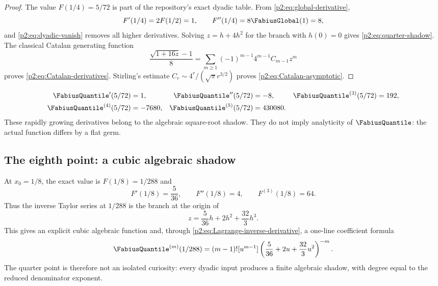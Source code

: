 \documentclass[11pt,oneside]{article}
\numberwithin{equation}{section}
\theoremstyle{definition}
\theoremstyle{remark}
\begin{document}
\begin{proof}
The value $F(1/4)=5/72$ is part of the repository's exact dyadic table.  From
\eqref{p2:eq:global-derivative},
\[
 F'(1/4)=2F(1/2)=1,
 \qquad
 F''(1/4)=8\FabiusGlobal(1)=8,
\]
and \eqref{p2:eq:dyadic-vanish} removes all higher derivatives.  Solving
$z=h+4h^2$ for the branch with $h(0)=0$ gives \eqref{p2:eq:quarter-shadow}.  The classical Catalan
generating function
\[
 \frac{\sqrt{1+16z}-1}{8}
 =\sum_{m\ge1}(-1)^{m-1}4^{m-1}C_{m-1}z^m
\]
proves \eqref{p2:eq:Catalan-derivatives}.  Stirling's estimate
$C_r\sim4^r/(\sqrt\pi r^{3/2})$ proves \eqref{p2:eq:Catalan-asymptotic}.
\end{proof}

\begin{example}
\begin{align*}
 \FabiusQuantile'(5/72)&=1,
 & \FabiusQuantile''(5/72)&=-8,
 & \FabiusQuantile^{(3)}(5/72)&=192,\\
 \FabiusQuantile^{(4)}(5/72)&=-7680,
 & \FabiusQuantile^{(5)}(5/72)&=430080.
\end{align*}
These rapidly growing derivatives belong to the algebraic square-root shadow.  They do not imply
analyticity of $\FabiusQuantile$: the actual function differs by a flat germ.
\end{example}

\subsection{The eighth point: a cubic algebraic shadow}

At $x_0=1/8$, the exact value is $F(1/8)=1/288$ and
\begin{equation}
 F'(1/8)=\frac5{36},
 \qquad F''(1/8)=4,
 \qquad F^{(3)}(1/8)=64.
 \label{p2:eq:eighth-jet}
\end{equation}
Thus the inverse Taylor series at $1/288$ is the branch at the origin of
\begin{equation}
 z=\frac5{36}h+2h^2+\frac{32}{3}h^3.
 \label{p2:eq:eighth-cubic}
\end{equation}
This gives an explicit cubic algebraic function and, through
\eqref{p2:eq:Lagrange-inverse-derivative}, a one-line coefficient formula
\begin{equation}
 \FabiusQuantile^{(m)}(1/288)
 =(m-1)![u^{m-1}]
 \left(\frac5{36}+2u+\frac{32}{3}u^2\right)^{-m}.
 \label{p2:eq:eighth-coeff}
\end{equation}
The quarter point is therefore not an isolated curiosity: every dyadic input produces a finite
algebraic shadow, with degree equal to the reduced denominator exponent.
\end{document}
